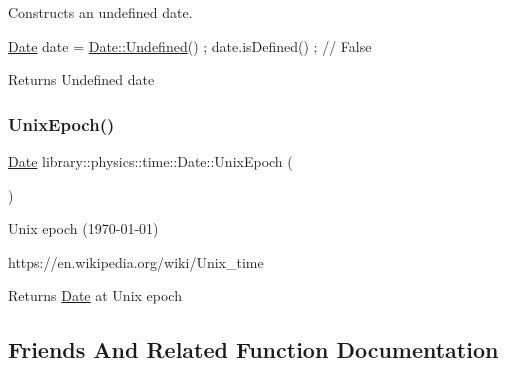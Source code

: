 Constructs an undefined date. 


\begin{DoxyCode}
\hyperlink{classlibrary_1_1physics_1_1time_1_1_date_a08e7d804b40b1bfaacbccd32cf79f292}{Date} date = \hyperlink{classlibrary_1_1physics_1_1time_1_1_date_a1fabcaeb4300781cc71e6cab35e158d1}{Date::Undefined}() ;
date.isDefined() ; \textcolor{comment}{// False}
\end{DoxyCode}


\begin{DoxyReturn}{Returns}
Undefined date 
\end{DoxyReturn}
\mbox{\label{classlibrary_1_1physics_1_1time_1_1_date_ac4279e501cf86444cce275776daa9b9c}} 
\subsubsection{\texorpdfstring{Unix\+Epoch()}{UnixEpoch()}}
{\footnotesize\ttfamily \hyperlink{classlibrary_1_1physics_1_1time_1_1_date}{Date} library\+::physics\+::time\+::\+Date\+::\+Unix\+Epoch (\begin{DoxyParamCaption}{ }\end{DoxyParamCaption})\hspace{0.3cm}{\ttfamily [static]}}



Unix epoch (1970-\/01-\/01) 

https\+://en.wikipedia.\+org/wiki/\+Unix\+\_\+time

\begin{DoxyReturn}{Returns}
\hyperlink{classlibrary_1_1physics_1_1time_1_1_date}{Date} at Unix epoch 
\end{DoxyReturn}


\subsection{Friends And Related Function Documentation}
\mbox{\label{classlibrary_1_1physics_1_1time_1_1_date_a70ae98f5f6c575ec0c9bd948d12dea41}} 
